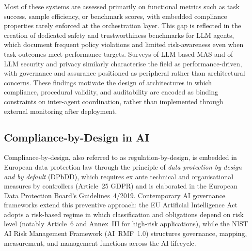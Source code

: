 \documentclass[oneside,10pt]{swissi}
\begin{document}
Most of these systems are assessed primarily on functional metrics such as task success, sample efficiency, or benchmark scores, with embedded compliance properties rarely enforced at the orchestration layer. This gap is reflected in the creation of dedicated safety and trustworthiness benchmarks for LLM agents, which document frequent policy violations and limited risk-awareness even when task outcomes meet performance targets.\cite{yuan2024rjudge,levy2024stwebagentbench} Surveys of LLM-based MAS and of LLM security and privacy similarly characterise the field as performance-driven, with governance and assurance positioned as peripheral rather than architectural concerns.\cite{li2024llmmas_survey,yao2024llmsecpriv} These findings motivate the design of architectures in which compliance, procedural validity, and auditability are encoded as binding constraints on inter-agent coordination, rather than implemented through external monitoring after deployment.

\subsection{Compliance-by-Design in AI}

Compliance-by-design, also referred to as regulation-by-design, is embedded in European data protection law through the principle of \emph{data protection by design and by default} (DPbDD), which requires ex ante technical and organisational measures by controllers (Article~25 GDPR) and is elaborated in the European Data Protection Board’s Guidelines~4/2019.\cite{gdpr2016,edpb2020art25} Contemporary AI governance frameworks extend this preventive approach: the EU Artificial Intelligence Act adopts a risk-based regime in which classification and obligations depend on risk level (notably Article~6 and Annex~III for high-risk applications), while the NIST AI Risk Management Framework (AI~RMF~1.0) structures governance, mapping, measurement, and management functions across the AI lifecycle.\cite{eu_ai_act_2024,nist_ai_rmf_2023}
\end{document}
